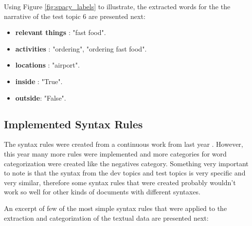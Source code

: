  
Using Figure \ref{fig:spacy_labels} to illustrate, the extracted words for the the narrative of the test topic 6 are presented next:
\newpage
    \begin{itemize}
      \itemsep0em
        \item \textbf{relevant things} : "fast food".
        \item \textbf{activities} : "ordering", "ordering fast food".
        \item \textbf{locations} : "airport".
        \item \textbf{inside} : "True".
        \item \textbf{outside}: "False".
       
    \end{itemize}

  \subsection{Implemented Syntax Rules}
  The syntax rules were created from a continuous work from last year \cite{Ribeiro2019}. However, this year many more rules were implemented and more categories for word categorization were created like the negatives category. Something very important to note is that the syntax from the dev topics and test topics is very specific and very similar, therefore some syntax rules that were created probably wouldn't work so well for other kinds of documents with different syntaxes.

  An excerpt of few of the most simple syntax rules that were applied to the extraction and categorization of the textual data are presented next:
  
